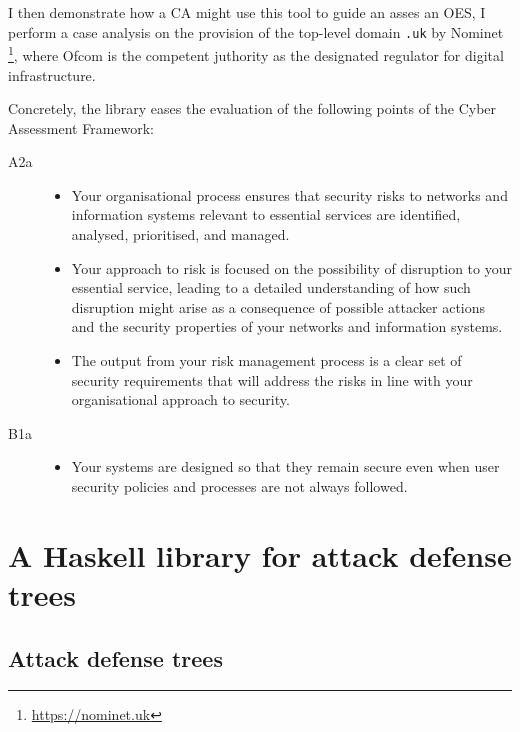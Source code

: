 \documentclass{scrreprt}
\begin{document}
I then demonstrate how a CA might use this tool to guide an asses an OES, I
perform a case analysis on the provision of the top-level domain \texttt{.uk} by
Nominet \footnote{\url{https://nominet.uk}}, where Ofcom is the competent
juthority as the designated regulator for digital infrastructure.

Concretely, the library eases the evaluation of the following points of the
Cyber Assessment Framework:

\begin{description}
    \item [A2a]
        \begin{itemize}
            \item Your organisational process ensures that security risks to
                networks and information systems relevant to essential services
                are identified, analysed, prioritised, and managed.
            \item Your approach to risk is focused on the possibility of
                disruption to your essential service, leading to a detailed
                understanding of how such disruption might arise as a
                consequence of possible attacker actions and the security
                properties of your networks and information systems.
            \item The output from your risk management process is a clear set of
                security requirements that will address the risks in line with
                your organisational approach to security.
        \end{itemize}

    \item [B1a]
        \begin{itemize}
            \item Your systems are designed so that they remain secure even when
                user security policies and processes are not always followed.
        \end{itemize}
\end{description}

\chapter{A Haskell library for attack defense trees}

\section{Attack defense trees}
\end{document}
